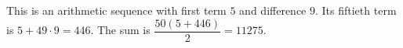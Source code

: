 This is an arithmetic sequence with first term $5$ and difference $9$. Its fiftieth term is $5+49\cdot9=446$. The sum is $\dfrac{50(5+446)}{2}=\boxed{11275}$.
